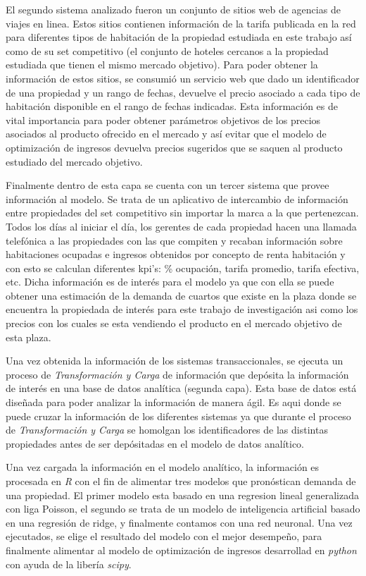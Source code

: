 El segundo sistema analizado fueron un conjunto de sitios web de agencias de viajes en linea. Estos sitios contienen información de la tarifa publicada en la red para diferentes tipos de habitación de la propiedad estudiada en este trabajo así como de su set competitivo (el conjunto de hoteles cercanos a la propiedad estudiada que tienen el mismo mercado objetivo). Para poder obtener la información de estos sitios, se consumió un servicio web que dado un identificador de una propiedad y un rango de fechas, devuelve el precio asociado a cada tipo de habitación disponible en el rango de fechas indicadas. Esta información es de vital importancia para poder obtener parámetros objetivos de los precios asociados al producto ofrecido en el mercado y así evitar que el modelo de optimización de ingresos devuelva precios sugeridos que se saquen al producto estudiado del mercado objetivo.

Finalmente dentro de esta capa se cuenta con un tercer sistema que provee información al modelo. Se trata de un aplicativo de intercambio de información entre propiedades del set competitivo sin importar la marca a la que pertenezcan. Todos los días al iniciar el día, los gerentes de cada propiedad hacen una llamada telefónica a las propiedades con las que compiten y recaban información sobre habitaciones ocupadas e ingresos obtenidos por concepto de renta habitación y con esto se calculan diferentes kpi's: \% ocupación, tarifa promedio, tarifa efectiva, etc. Dicha información es de interés para el modelo ya que con ella se puede obtener una estimación de la demanda de cuartos que existe en la plaza donde se encuentra la propiedada de interés para este trabajo de investigación asi como los precios con los cuales se esta vendiendo el producto en el mercado objetivo de esta plaza.

Una vez obtenida la información de los sistemas transaccionales, se ejecuta un proceso de \emph{Transformación y Carga} de información que depósita la información de interés en una base de datos analítica (segunda capa). Esta base de datos está diseñada para poder analizar la información de manera ágil. Es aqui donde se puede cruzar la información de los diferentes sistemas ya que durante el proceso de \emph{Transformación y Carga} se homolgan los identificadores de las distintas propiedades antes de ser depósitadas en el modelo de datos analítico.

Una vez cargada la información en el modelo analítico, la información es procesada en \emph{R} con el fin de alimentar tres modelos que pronóstican demanda de una propiedad. El primer modelo esta basado en una regresion lineal generalizada con liga Poisson, el segundo se trata de un modelo de inteligencia artificial basado en una regresión de ridge, y finalmente contamos con una red neuronal. Una vez ejecutados, se elige el resultado del modelo con el mejor desempeño, para finalmente alimentar al modelo de optimización de ingresos desarrollad en \emph{python} con ayuda de la libería \emph{scipy}.

